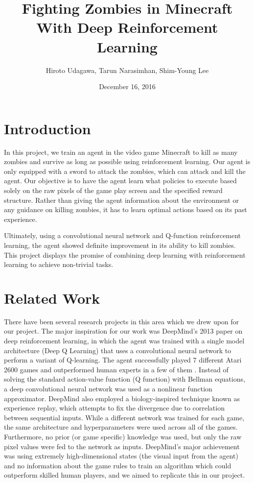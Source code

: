 \documentclass{article}
\title{Fighting Zombies in Minecraft With Deep Reinforcement Learning}
\author{Hiroto Udagawa, Tarun Narasimhan, Shim-Young Lee}
\date{December 16, 2016}
\begin{document}
\maketitle

\begin{multicols}{2}

\section{Introduction}

In this project, we train an agent in the video game Minecraft to kill as many zombies and survive as long as possible using reinforcement learning. Our agent is only equipped with a sword to attack the zombies, which can attack and kill the agent. Our objective is to have the agent learn what policies to execute based solely on the raw pixels of the game play screen and the specified reward structure. Rather than giving the agent information about the environment or any guidance on killing zombies, it has to learn optimal actions based on its past experience.

Ultimately, using a convolutional neural network and Q-function reinforcement learning, the agent showed definite improvement in its ability to kill zombies. This project displays the promise of combining deep learning with reinforcement learning to achieve non-trivial tasks.





\section{Related Work}

There have been several research projects in this area which we drew upon for our project.
The major inspiration for our work was DeepMind's 2013 paper on deep reinforcement learning, in which the agent was trained with a single model architecture (Deep Q Learning) that uses a convolutional neural network to perform a variant of Q-learning. The agent successfully played 7 different Atari 2600 games and outperformed human experts in a few of them \cite{deepMind}.
Instead of solving the standard action-value function (Q function) with Bellman equations, a deep convolutional neural network was used as a nonlinear function approximator. DeepMind also employed a biology-inspired technique known as experience replay, which attempts to fix the divergence due to correlation between sequential inputs.
While a different network was trained for each game, the same architecture and hyperparameters were used across all of the games.
Furthermore, no prior (or game specific) knowledge was used, but only the raw pixel values were fed to the network as inputs.
DeepMind's major achievement was using extremely high-dimensional states (the visual input from the agent) and no information about the game rules to train an algorithm which could outperform skilled human players, and we aimed to replicate this in our project.


\end{multicols}
\end{document}
